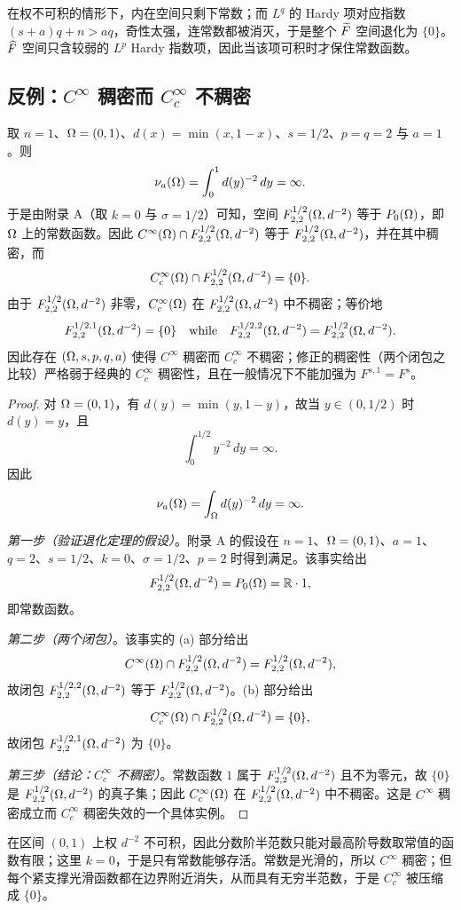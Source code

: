 \begin{remark}[直觉]
在权不可积的情形下，内在空间只剩下常数；而 $L^q$ 的 Hardy 项对应指数 $(s+a)q+n>aq$，奇性太强，连常数都被消灭，于是整个 $\widetilde F$ 空间退化为 $\{0\}$。$\widehat F$ 空间只含较弱的 $L^p$ Hardy 指数项，因此当该项可积时才保住常数函数。
\end{remark}

\subsection{反例：\texorpdfstring{$C^\infty$}{C-infinity} 稠密而 \texorpdfstring{$C_c^\infty$}{Cc-infinity} 不稠密}

\begin{theorem}
取 $n=1$、$\Omega=(0,1)$、$d(x)=\min(x,1-x)$、$s=1/2$、$p=q=2$ 与 $a=1$。则
\[
  \nu_{a}(\Omega)=\int_0^1 d(y)^{-2}\,dy=\infty .
\]
于是由附录 A（取 $k=0$ 与 $\sigma=1/2$）可知，空间 $F^{1/2}_{2,2}(\Omega,d^{-2})$ 等于 $P_0(\Omega)$，即 $\Omega$ 上的常数函数。因此 $C^\infty(\Omega)\cap F^{1/2}_{2,2}(\Omega,d^{-2})$ 等于 $F^{1/2}_{2,2}(\Omega,d^{-2})$，并在其中稠密，而
\[
  C_c^\infty(\Omega)\cap F^{1/2}_{2,2}(\Omega,d^{-2})=\{0\} .
\]
由于 $F^{1/2}_{2,2}(\Omega,d^{-2})$ 非零，$C_c^\infty(\Omega)$ 在 $F^{1/2}_{2,2}(\Omega,d^{-2})$ 中不稠密；等价地
\[
  F^{1/2,1}_{2,2}(\Omega,d^{-2})=\{0\}
  \quad\text{while}\quad
  F^{1/2,2}_{2,2}(\Omega,d^{-2})=F^{1/2}_{2,2}(\Omega,d^{-2}) .
\]
因此存在 $(\Omega,s,p,q,a)$ 使得 $C^\infty$ 稠密而 $C_c^\infty$ 不稠密；修正的稠密性（两个闭包之比较）严格弱于经典的 $C_c^\infty$ 稠密性，且在一般情况下不能加强为 $F^{s,1}=F^s$。
\end{theorem}

\begin{proof}
对 $\Omega=(0,1)$，有 $d(y)=\min(y,1-y)$，故当 $y\in(0,1/2)$ 时 $d(y)=y$，且
\[
  \int_0^{1/2} y^{-2}\,dy=\infty .
\]
因此
\[
  \nu_{a}(\Omega)=\int_\Omega d(y)^{-2}\,dy=\infty .
\]

\emph{第一步（验证退化定理的假设）}。附录 A 的假设在 $n=1$、$\Omega=(0,1)$、$a=1$、$q=2$、$s=1/2$、$k=0$、$\sigma=1/2$、$p=2$ 时得到满足。该事实给出
\[
  F^{1/2}_{2,2}(\Omega,d^{-2})=P_0(\Omega)=\mathbb{R}\cdot 1 ,
\]
即常数函数。

\emph{第二步（两个闭包）}。该事实的 (a) 部分给出
\[
  C^\infty(\Omega)\cap F^{1/2}_{2,2}(\Omega,d^{-2})=F^{1/2}_{2,2}(\Omega,d^{-2}) ,
\]
故闭包 $F^{1/2,2}_{2,2}(\Omega,d^{-2})$ 等于 $F^{1/2}_{2,2}(\Omega,d^{-2})$。(b) 部分给出
\[
  C_c^\infty(\Omega)\cap F^{1/2}_{2,2}(\Omega,d^{-2})=\{0\} ,
\]
故闭包 $F^{1/2,1}_{2,2}(\Omega,d^{-2})$ 为 $\{0\}$。

\emph{第三步（结论：$C_c^\infty$ 不稠密）}。常数函数 $1$ 属于 $F^{1/2}_{2,2}(\Omega,d^{-2})$ 且不为零元，故 $\{0\}$ 是 $F^{1/2}_{2,2}(\Omega,d^{-2})$ 的真子集；因此 $C_c^\infty(\Omega)$ 在 $F^{1/2}_{2,2}(\Omega,d^{-2})$ 中不稠密。这是 $C^\infty$ 稠密成立而 $C_c^\infty$ 稠密失效的一个具体实例。
\end{proof}

\begin{remark}[直觉]
在区间 $(0,1)$ 上权 $d^{-2}$ 不可积，因此分数阶半范数只能对最高阶导数取常值的函数有限；这里 $k=0$，于是只有常数能够存活。常数是光滑的，所以 $C^\infty$ 稠密；但每个紧支撑光滑函数都在边界附近消失，从而具有无穷半范数，于是 $C_c^\infty$ 被压缩成 $\{0\}$。
\end{remark}
